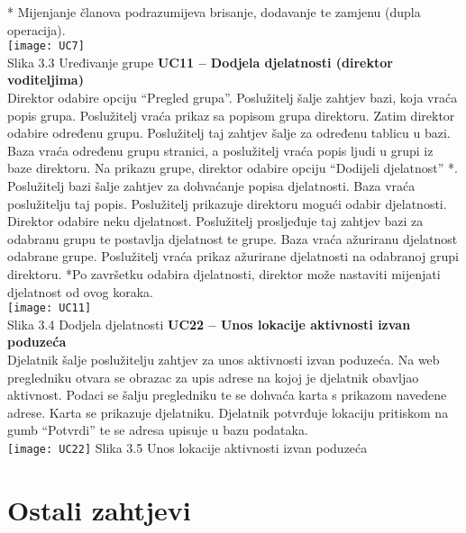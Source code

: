 				* Mijenjanje članova podrazumijeva brisanje, dodavanje te zamjenu (dupla operacija).\\
				\texttt{[image: UC7]}\\
				Slika 3.3 Uređivanje grupe
				\eject
				\noindent \textbf{UC11 – Dodjela djelatnosti (direktor voditeljima)\\}
				Direktor odabire opciju “Pregled grupa”. Poslužitelj šalje zahtjev bazi, koja vraća popis grupa. Poslužitelj vraća prikaz sa popisom grupa direktoru. Zatim direktor odabire određenu grupu. Poslužitelj taj zahtjev šalje za određenu tablicu u bazi. Baza vraća određenu grupu stranici, a poslužitelj vraća popis ljudi u grupi iz baze direktoru. Na prikazu grupe, direktor odabire opciju “Dodijeli djelatnost” *. Poslužitelj bazi šalje zahtjev za dohvaćanje popisa djelatnosti. Baza vraća poslužitelju taj popis. Poslužitelj prikazuje direktoru mogući odabir djelatnosti. Direktor odabire neku djelatnost. Poslužitelj prosljeđuje taj zahtjev bazi za odabranu grupu te postavlja djelatnost te grupe. Baza vraća ažuriranu djelatnost odabrane grupe. Poslužitelj vraća prikaz ažurirane djelatnosti na odabranoj grupi direktoru.  
				*Po završetku odabira djelatnosti, direktor može nastaviti mijenjati djelatnost od ovog koraka.\\ 
				\texttt{[image: UC11]}\\
				Slika 3.4 Dodjela djelatnosti
				\eject
				\noindent \textbf{UC22 – Unos lokacije aktivnosti izvan poduzeća\\}
				Djelatnik šalje poslužitelju zahtjev za unos aktivnosti izvan poduzeća. Na web pregledniku otvara se obrazac za upis adrese na kojoj je djelatnik obavljao aktivnost. Podaci se šalju pregledniku te se dohvaća karta s prikazom navedene adrese. Karta se prikazuje djelatniku. Djelatnik potvrđuje lokaciju pritiskom na gumb “Potvrdi” te se adresa upisuje u bazu podataka.\\
				\texttt{[image: UC22]}
				Slika 3.5 Unos lokacije aktivnosti izvan poduzeća
				\eject
	
		\section{Ostali zahtjevi}
		 	
